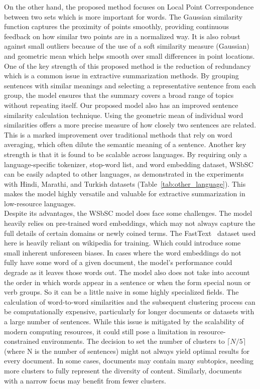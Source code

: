 On the other hand, the proposed method focuses on Local Point Correspondence between
two sets which is more important for words.
The Gaussian similarity function captures the proximity of points smoothly,
providing continuous feedback on how similar two points are in a normalized way.
It is also robust against small outliers because of the use of a soft similarity measure (Gaussian)
and geometric mean which helps smooth over small differences in point locations.\\

One of the key strength of this proposed method is the reduction of redundancy
which is a common issue in extractive summarization methods.
By grouping sentences with similar meanings and selecting a representative
sentence from each group, the model ensures that the summary covers
a broad range of topics without repeating itself.
Our proposed model also has an improved sentence similarity calculation technique.
Using the geometric mean of individual word similarities offers a more precise measure
of how closely two sentences are related.
This is a marked improvement over traditional methods that
rely on word averaging, which often dilute the semantic meaning of a sentence.
Another key strength is that it is found to be scalable across languages.
By requiring only a language-specific tokenizer, stop-word list, and word embedding dataset,
WSbSC can be easily adapted to other languages, as demonstrated in the experiments with
Hindi, Marathi, and Turkish datasets (Table~\ref{tab:other_language}).
This makes the model highly versatile and valuable for extractive summarization in low-resource languages.\\


Despite its advantages, the WSbSC model does face some challenges.
The model heavily relies on pre-trained word embeddings, which may not always capture the full details
of certain domains or newly coined terms.
The FastText~\cite{grave-etal-2018-fasttext} dataset used here is heavily reliant on wikipedia for training.
Which could introduce some small inherent unforeseen biases.
In cases where the word embeddings do not fully have some word of a given document,
the model’s performance could degrade as it leaves those words out.
The model also does not take into account the order in which words appear in a sentence
or when the form special noun or verb groups.
So it can be a little naive in some highly specialized fields.
The calculation of word-to-word similarities and the subsequent
clustering process can be computationally expensive,
particularly for longer documents or datasets with a large number of sentences.
While this issue is mitigated by the scalability of modern computing resources,
it could still pose a limitation in resource-constrained environments.
The decision to set the number of clusters to $\lceil N/5 \rceil$ (where N is
the number of sentences) might not always yield optimal results for every document.
In some cases, documents may contain many subtopics, needing more
clusters to fully represent the diversity of content.
Similarly, documents with a narrow focus may benefit from fewer clusters.\\

